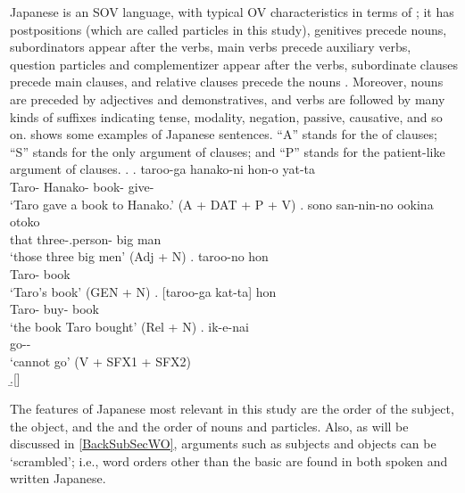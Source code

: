 Japanese is an SOV language, with typical OV characteristics
in terms of ;
it has postpositions (which are called particles in this study),
genitives precede nouns,
 subordinators appear after the verbs,
main verbs precede auxiliary verbs,
question particles and complementizer appear after the verbs,
subordinate clauses precede main clauses, and
relative clauses precede the nouns
\cite{shibatani90,masuokatakubo92}.
Moreover,
nouns are preceded by adjectives and demonstratives,
and verbs are followed by many kinds of suffixes indicating tense, modality, negation, passive, causative, and so on.
\Next shows some examples of Japanese sentences.
``A'' stands for the  of  clauses;
``S'' stands for the only argument of  clauses; and
``P'' stands for the patient-like argument of  clauses.
%
\ex.
     \ag. taroo-ga hanako-ni hon-o yat-ta \\
        Taro- Hanako- book- give- \\
        `Taro gave a book to Hanako.' \hfill{(A + DAT + P + V)}
     \bg. sono san-nin-no ookina otoko \\
          that three-.person- big man \\
          `those three big men' \hfill{(Adj + N)}
     \bg. taroo-no hon \\
          Taro- book \\
          `Taro's book' \hfill{(GEN + N)}
     \bg. [taroo-ga kat-ta] hon \\
           Taro- buy- book \\
           `the book Taro bought' \hfill{(Rel + N)}
     \bg. ik-e-nai \\
          go-- \\
          `cannot go' \hfill{(V + SFX1 + SFX2)} \\
     \b.[] \hfill{\cite[257--258, glosses modified by NN]{shibatani90}}

The features of Japanese most relevant in this study are the order of the subject, the object, and the  and the order of nouns and particles.
Also, as will be discussed in \ref{BackSubSecWO},
arguments such as subjects and objects can be `scrambled';
i.e., word orders other than the basic  are found in both spoken and written Japanese.

